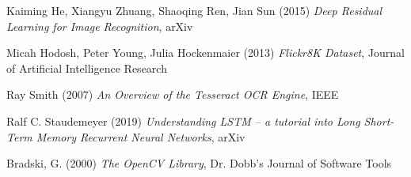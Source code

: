 \documentclass[11pt, a4paper, twocolumn]{article}
\begin{document}
\begin{thebibliography}{30}
Kaiming He, Xiangyu Zhuang, Shaoqing Ren, Jian Sun (2015) \emph{Deep Residual Learning for Image Recognition}, arXiv

Micah Hodosh, Peter Young, Julia Hockenmaier (2013) \emph{Flickr8K Dataset}, Journal of Artificial Intelligence Research

Ray Smith (2007) \emph{An Overview of the Tesseract OCR Engine}, IEEE

Ralf C. Staudemeyer (2019) \emph{Understanding LSTM -- a tutorial into Long Short-Term Memory Recurrent Neural Networks}, arXiv

Bradski, G. (2000) \emph{The OpenCV Library}, Dr. Dobb's Journal of Software Tools

\end{thebibliography}
\end{document}
